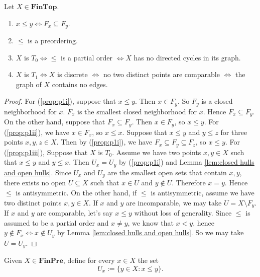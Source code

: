 \begin{proposition}
	Let $X \in \mathbf{FinTop}$.
	\begin{enumerate}[label=\romansmallnumbering]
		\item \label{prop:p1i} $x \leq y \iff F_x \subseteq F_y$.
		\item \label{prop:p1ii} $\leq$ is a preordering.
		\item \label{prop:p1iii} $X$ is $T_0 \iff \leq$ is a partial order 
			$\iff X$ has no directed cycles in its graph.
		\item \label{prop:p1iv} $X$ is $T_1 \iff X$ is discrete $\iff$ no
		two distinct points are comparable $\iff$ the graph of $X$ contains
		no edges.
	\end{enumerate}
\end{proposition}
\begin{proof}
For (\ref{prop:p1i}), suppose that $x \leq y$. Then $x \in F_y$. So $F_y$ is a
closed neighborhood for $x$. $F_x$ is the smallest closed neighborhood for
$x$. Hence $F_x \subseteq F_y$. On the other hand, suppose that
$F_x \subseteq F_y$. Then $x \in F_y$, so $x \leq y$. For (\ref{prop:p1ii}),
we have $x \in F_x$, so $x \leq x$. Suppose that $x \leq y$ and $y \leq z$ for
three points $x,y,z \in X$. Then by (\ref{prop:p1i}), we have
$F_x \subseteq F_y \subseteq F_z$, so $x \leq y$. For (\ref{prop:p1iii}),
Suppose that $X$ is $T_0$. 
Assume we have two points $x,y \in X$ such that
$x \leq y$ and $y \leq x$. 
Then $U_x = U_y$ by (\ref{prop:p1i}) and Lemma
\ref{lem:closed hulls and open hulls}. 
Since $U_x$ and $U_y$ are the smallest
open sets that contain $x,y$, there exists no open $U \subseteq X$ such that
$x \in U$ and $y \not\in U$. 
Therefore $x=y$. Hence $\leq$ is antisymmetric.
On the other hand, if $\leq$ is antisymmetric, assume we have two distinct
points $x,y \in X$.
If $x$ and $y$ are incomparable, we may take $U = X \setminus F_y$.
If $x$ and $y$ are comparable, let's say $x \leq y$ without loss of
generality.
Since $\leq$ is assumed to be a partial order and $x \neq y$, we know that
$x < y$, hence $y \not\in F_x \iff x \not\in U_y$ by Lemma
\ref{lem:closed hulls and open hulls}.
So we may take $U = U_y$.
\end{proof}
\begin{definition}
	Given $X \in \mathbf{FinPre}$, define for every $x \in X$ the set
	\[ U_x := \{y \in X : x \leq y \}. \]
\end{definition}
